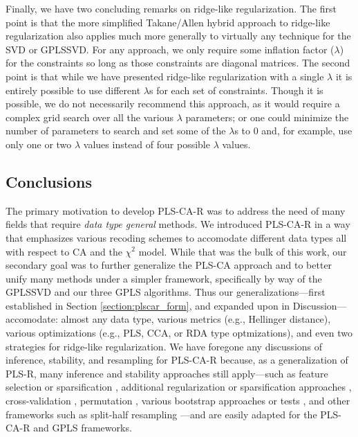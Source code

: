\documentclass[12pt]{article}
\begin{document}
Finally, we have two concluding remarks on ridge-like regularization.
The first point is that the more simplified Takane/Allen hybrid approach
to ridge-like regularization also applies much more generally to
virtually any technique for the SVD or GPLSSVD. For any approach, we
only require some inflation factor (\(\lambda\)) for the constraints so
long as those constraints are diagonal matrices. The second point is
that while we have presented ridge-like regularization with a single
\(\lambda\) it is entirely possible to use different \(\lambda\)s for
each set of constraints. Though it is possible, we do not necessarily
recommend this approach, as it would require a complex grid search over
all the various \(\lambda\) parameters; or one could minimize the number
of parameters to search and set some of the \(\lambda\)s to 0 and, for
example, use only one or two \(\lambda\) values instead of four possible
\(\lambda\) values.

\hypertarget{conclusions}{%
\subsection{Conclusions}\label{conclusions}}

The primary motivation to develop PLS-CA-R was to address the need of
many fields that require \textit{data type general} methods. We
introduced PLS-CA-R in a way that emphasizes various recoding schemes to
accomodate different data types all with respect to CA and the
\(\chi^2\) model. While that was the bulk of this work, our secondary
goal was to further generalize the PLS-CA approach and to better unify
many methods under a simpler framework, specifically by way of the
GPLSSVD and our three GPLS algorithms. Thus our generalizations---first
established in Section \ref{section:plscar_form}, and expanded upon in
Discussion---accomodate: almost any data type, various metrics (e.g.,
Hellinger distance), various optimizations (e.g., PLS, CCA, or RDA type
optmizations), and even two strategies for ridge-like regularization. We
have foregone any discussions of inference, stability, and resampling
for PLS-CA-R because, as a generalization of PLS-R, many inference and
stability approaches still apply---such as feature selection or
sparsification \citep{sutton_sparse_2018}, additional regularization or
sparsification approaches
\citep{le_floch_significant_2012-1, guillemot2019constrained, tenenhaus_variable_2014, tenenhaus_regularized_2011},
cross-validation
\citep{wold_principal_1987, rodriguez-perez_overoptimism_2018, kvalheim_number_2019, abdi_partial_2010-1},
permutation \citep{berry_permutation_2011}, various bootstrap
\citep{efron_bootstrap_1979, chernick_bootstrap_2008} approaches
\citep{abdi_partial_2010-1, takane_regularized_2009-1} or tests
\citep{mcintosh_partial_2004, krishnan_partial_2011}, and other
frameworks such as split-half resampling
\citep{strother_quantitative_2002-1, kovacevic2013revisiting, strother2004optimizing}---and
are easily adapted for the PLS-CA-R and GPLS frameworks.
\end{document}
